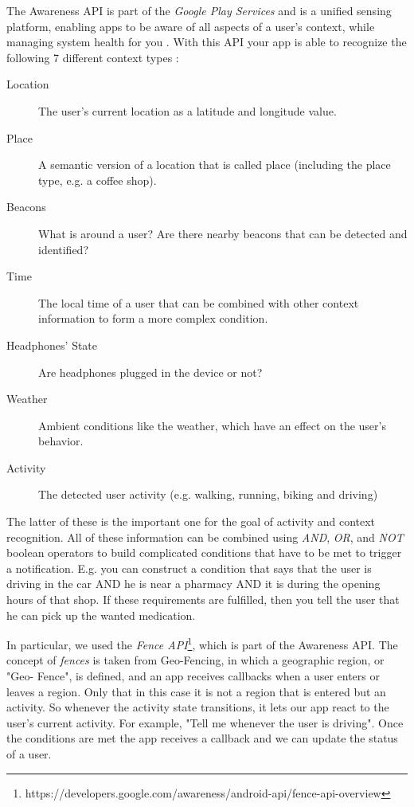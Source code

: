 \documentclass{sigchi}
\begin{document}
The Awareness API is part of the \textit{Google Play Services} and is a unified sensing platform, enabling apps to be aware of all aspects of a user's context, while managing system health for you \cite{you16}. With this API your app is able to recognize the following 7 different context types \cite{goo16}:
\begin{description}
\item[Location]
The user's current location as a latitude and longitude value.
\item[Place]
A semantic version of a location that is called place (including the place type, e.g. a coffee shop).
\item[Beacons]
What is around a user? Are there nearby beacons that can be detected and identified?
\item[Time]
The local time of a user that can be combined with other context information to form a more complex condition.
\item[Headphones' State]
Are headphones plugged in the device or not?
\item[Weather]
Ambient conditions like the weather, which have an effect on the user's behavior.
\item[Activity]
The detected user activity (e.g. walking, running, biking and driving)
\end{description}

The latter of these is the important one for the goal of activity and context recognition. All of these information can be combined using \textit{AND}, \textit{OR}, and \textit{NOT} boolean operators to build complicated conditions that have to be met to trigger a notification. E.g. you can construct a condition that says that the user is driving in the car AND he is near a pharmacy AND it is during the opening hours of that shop. If these requirements are fulfilled, then you tell the user that he can pick up the wanted medication.

In particular, we used the \textit{Fence API}\footnote{https://developers.google.com/awareness/android-api/fence-api-overview}, which is part of the Awareness API. The concept of \textit{fences} is taken from Geo-Fencing, in which a geographic region, or "Geo- Fence", is defined, and an app receives callbacks when a user enters or leaves a region. Only that in this case it is not a region that is entered but an activity. So whenever the activity state transitions, it lets our app react to the user's current activity. For example, "Tell me whenever the user is driving". Once the conditions are met the app receives a callback and we can update the status of a user.
\end{document}

